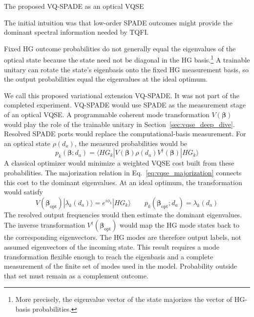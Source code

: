 \begin{infobox}{The proposed VQ-SPADE as an optical VQSE}

    The initial intuition was that low-order SPADE outcomes might provide the dominant spectral information needed by TQFI.

    \faLightbulb \hspace{5pt} Fixed HG outcome probabilities do not generally equal the eigenvalues of the optical state because the state need not be diagonal in the HG basis.\footnote{More precisely, the eigenvalue vector of the state majorizes the vector of HG-basis probabilities.} A trainable unitary can rotate the state's eigenbasis onto the fixed HG measurement basis, so the output probabilities equal the eigenvalues at the ideal optimum.

    We call this proposed variational extension VQ-SPADE.  It was not part of the completed experiment.  VQ-SPADE would use SPADE as the measurement stage of an optical VQSE.  A programmable coherent mode transformation $V(\boldsymbol\beta)$ would play the role of the trainable unitary in Section~\ref{sec:vqse_deep_dive}.  Resolved SPADE ports would replace the computational-basis measurement.  For an optical state $\rho(d_a)$, the measured probabilities would be
    \begin{equation}
        p_k(\boldsymbol\beta;d_a)
        =\langle HG_k|V(\boldsymbol\beta)\rho(d_a)
        V^\dagger(\boldsymbol\beta)|HG_k\rangle
        \label{eq:spade_optical_vqse_probabilities}
    \end{equation}
    A classical optimizer would minimize a weighted VQSE cost built from these probabilities.  The majorization relation in Eq.~\eqref{eq:vqse_majorization} connects this cost to the dominant eigenvalues.  At an ideal optimum, the transformation would satisfy
    \begin{equation}
        V(\boldsymbol\beta_{\mathrm{opt}})|\lambda_k(d_a)\rangle
        =e^{i\phi_k}|HG_k\rangle
        \qquad
        p_k(\boldsymbol\beta_{\mathrm{opt}};d_a)=\lambda_k(d_a)
        \label{eq:spade_optical_vqse_mapping}
    \end{equation}
    The resolved output frequencies would then estimate the dominant eigenvalues.  The inverse transformation $V^\dagger(\boldsymbol\beta_{\mathrm{opt}})$ would map the HG mode states back to the corresponding eigenvectors.  The HG modes are therefore output labels, not assumed eigenvectors of the incoming state.  This result requires a mode transformation flexible enough to reach the eigenbasis and a complete measurement of the finite set of modes used in the model.  Probability outside that set must remain as a complement outcome.


\end{infobox}
